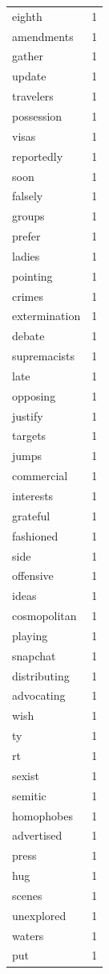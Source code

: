 \begin{tabular}{lr}
eighth & 1 \\
amendments & 1 \\
gather & 1 \\
update & 1 \\
travelers & 1 \\
possession & 1 \\
visas & 1 \\
reportedly & 1 \\
soon & 1 \\
falsely & 1 \\
groups & 1 \\
prefer & 1 \\
ladies & 1 \\
pointing & 1 \\
crimes & 1 \\
extermination & 1 \\
debate & 1 \\
supremacists & 1 \\
late & 1 \\
opposing & 1 \\
justify & 1 \\
targets & 1 \\
jumps & 1 \\
commercial & 1 \\
interests & 1 \\
grateful & 1 \\
fashioned & 1 \\
side & 1 \\
offensive & 1 \\
ideas & 1 \\
cosmopolitan & 1 \\
playing & 1 \\
snapchat & 1 \\
distributing & 1 \\
advocating & 1 \\
wish & 1 \\
ty & 1 \\
rt & 1 \\
sexist & 1 \\
semitic & 1 \\
homophobes & 1 \\
advertised & 1 \\
press & 1 \\
hug & 1 \\
scenes & 1 \\
unexplored & 1 \\
waters & 1 \\
put & 1 \\

\end{tabular}
